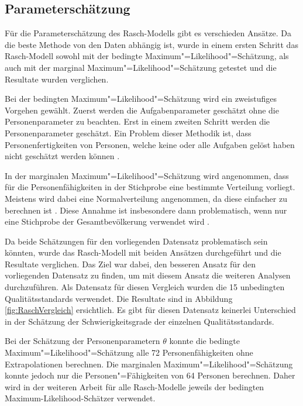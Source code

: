 \subsection{Parameterschätzung}
Für die Parameterschätzung des Rasch-Modells gibt es verschieden Ansätze. Da die beste Methode von den Daten abhängig ist, wurde in einem ersten Schritt das Rasch-Modell sowohl mit der bedingte Maximum"=Likelihood"=Schätzung, als auch mit der marginal Maximum"=Likelihood"=Schätzung getestet und die Resultate wurden verglichen. 

Bei der bedingten Maximum"=Likelihood"=Schätzung wird ein zweistufiges Vorgehen gewählt. Zuerst werden die Aufgabenparameter geschätzt ohne die Personenparameter zu beachten. Erst in einem zweiten Schritt werden die Personenparameter geschätzt. Ein Problem dieser Methodik ist, dass Personenfertigkeiten von Personen, welche keine oder alle Aufgaben gelöst haben nicht geschätzt werden können \citep{Mair2007}.

In der marginalen Maximum"=Likelihood"=Schätzung wird angenommen, dass für die Personenfähigkeiten in der Stichprobe eine bestimmte Verteilung vorliegt. Meistens wird dabei eine Normalverteilung angenommen, da diese einfacher zu berechnen ist \citep{Strobl2012}. Diese Annahme ist insbesondere dann problematisch, wenn nur eine Stichprobe der Gesamtbevölkerung verwendet wird \citep{Rizopoulos2006}.

Da beide Schätzungen für den vorliegenden Datensatz problematisch sein könnten, wurde das Rasch-Modell mit beiden Ansätzen durchgeführt und die Resultate verglichen. Das Ziel war dabei, den besseren Ansatz für den vorliegenden Datensatz zu finden, um mit diesem Ansatz die weiteren Analysen durchzuführen. Als Datensatz für diesen Vergleich wurden die 15 unbedingten Qualitätsstandards verwendet. Die Resultate sind in Abbildung \ref{fig:RaschVergleich} ersichtlich. Es gibt für diesen Datensatz keinerlei Unterschied in der Schätzung der Schwierigkeitsgrade der einzelnen Qualitätsstandards. 

Bei der Schätzung der Personenparametern $\theta$ konnte die bedingte Maximum"=Likelihood"=Schätzung alle 72 Personenfähigkeiten ohne Extrapolationen berechnen. Die marginalen Maximum"=Likelihood"=Schätzung konnte jedoch nur die Personen"=Fähigkeiten von 64 Personen berechnen. Daher wird in der weiteren Arbeit für alle Rasch-Modelle jeweils der bedingten Maximum-Likelihood-Schätzer verwendet.


